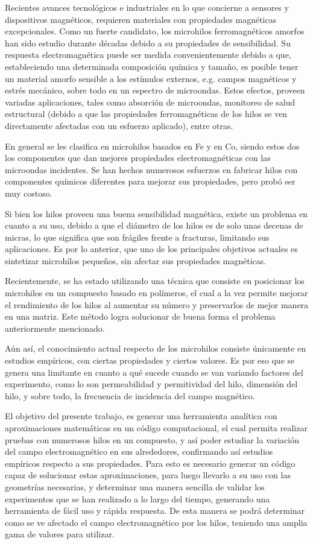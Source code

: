 \documentclass[12pt,letterpaper]{article}
\numberwithin{equation}{section}
\begin{document}
Recientes avances tecnológicos e industriales en lo que concierne a sensores y dispositivos magnéticos, requieren materiales con propiedades magnéticas excepcionales. Como un fuerte candidato, los microhilos ferromagnéticos amorfos han sido estudio durante décadas debido a su propiedades de sensibilidad. Su respuesta electromagnética puede ser medida convenientemente debido a que, estableciendo una determinada composición química y tamaño, es posible tener un material amorfo sensible a los estímulos externos, e.g. campos magnéticos y estrés mecánico, sobre todo en un espectro de microondas. Estos efectos, proveen variadas aplicaciones, tales como absorción de microondas, monitoreo de salud estructural (debido a que las propiedades ferromagnéticas de los hilos se ven directamente afectadas con un esfuerzo aplicado), entre otras. 


En general se les clasifica en microhilos basados en Fe y en Co, siendo estos dos los componentes que dan mejores propiedades electromagnéticas con las microondas incidentes. Se han hechos numerosos esfuerzos en fabricar hilos con componentes químicos diferentes para mejorar sus propiedades, pero probó ser muy costoso. 


Si bien los hilos proveen una buena sensibilidad magnética, existe un problema en cuanto a su uso, debido a que el diámetro de los hilos es de solo unas decenas de micras, lo que significa que son frágiles frente a fracturas, limitando sus aplicaciones. Es por lo anterior, que uno de los principales objetivos actuales es sintetizar microhilos pequeños, sin afectar sus propiedades magnéticas.


Recientemente, se ha estado utilizando una técnica que consiste en posicionar los microhilos en un compuesto basado en polímeros, el cual a la vez permite mejorar el rendimiento de los hilos al aumentar su número y preservarlos de mejor manera en una matriz. Este método logra solucionar de buena forma el problema anteriormente mencionado.


Aún así, el conocimiento actual respecto de los microhilos consiste únicamente en estudios empíricos, con ciertas propiedades y ciertos valores. Es por eso que se genera una limitante en cuanto a qué sucede cuando se van variando factores del experimento, como lo son permeabilidad y permitividad del hilo, dimensión del hilo, y sobre todo, la frecuencia de incidencia del campo magnético.


El objetivo del presente trabajo, es generar una herramienta analítica con aproximaciones matemáticas en un código computacional, el cual permita realizar pruebas con numerosos hilos en un compuesto, y así poder estudiar la variación del campo electromagnético en sus alrededores, confirmando así estudios empíricos respecto a sus propiedades. Para esto es necesario generar un código capaz de solucionar estas aproximaciones, para luego llevarlo a su uso con las geometrías necesarias, y determinar una manera sencilla de validar los experimentos que se han realizado a lo largo del tiempo, generando una herramienta de fácil uso y rápida respuesta. De esta manera se podrá determinar como se ve afectado el campo electromagnético por los hilos, teniendo una amplia gama de valores para utilizar.
	
\end{document}

